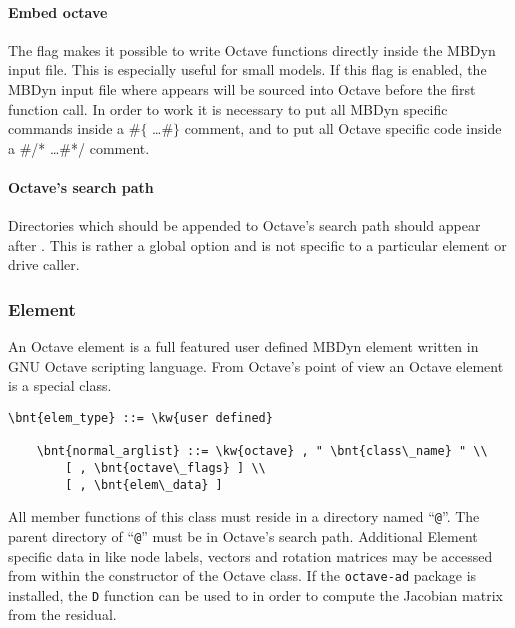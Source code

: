 \paragraph{Embed octave}
The flag  makes it possible to write Octave functions directly inside the MBDyn input file.
This is especially useful for small models. If this flag is enabled, the MBDyn input file where  appears will be sourced into Octave before the first function call.
In order to work it is necessary to put all MBDyn specific commands inside a $\#\lbrace$ \ldots $\#\rbrace$ comment, and to put all Octave specific code inside a \#/* \ldots \#*/ comment.

\paragraph{Octave's search path}
Directories which should be appended to Octave's search path should appear after .
This is rather a global option and is not specific to a particular element or drive caller.

\subsubsection{Element}
An Octave element is a full featured user defined MBDyn element written in GNU Octave scripting language.
From Octave's point of view an Octave element is a special class.
\begin{Verbatim}[commandchars=\\\{\}]
    \bnt{elem_type} ::= \kw{user defined}

    \bnt{normal_arglist} ::= \kw{octave} , " \bnt{class\_name} " \\
        [ , \bnt{octave\_flags} ] \\
        [ , \bnt{elem\_data} ]
\end{Verbatim}
All member functions of this class must reside in a directory named ``\texttt{@}''.
The parent directory of ``\texttt{@}'' must be in Octave's search path.
Additional Element specific data in  like node labels,
vectors and rotation matrices may be accessed from within the constructor
of the Octave class.
If the \texttt{octave-ad} package is installed,
the \texttt{D} function can be used to in order to compute
the Jacobian matrix from the residual.

